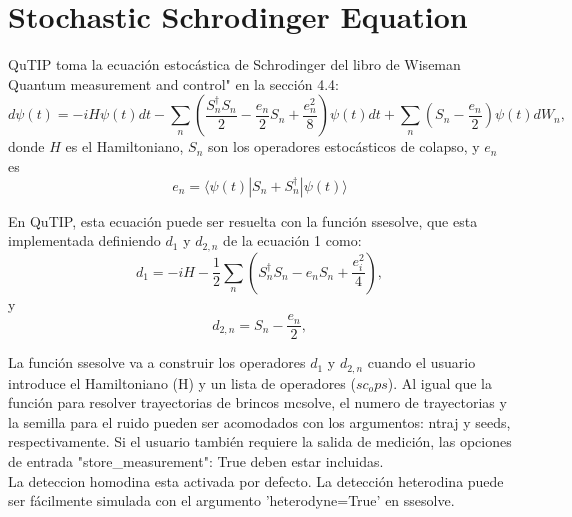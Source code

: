 \documentclass[12pt]{report}
\begin{document}
\section{Stochastic Schrodinger Equation}
QuTIP toma la ecuación estocástica de Schrodinger del libro de Wiseman Quantum measurement and control" en la sección 4.4:\\
\begin{equation}
    d\psi(t) = -iH\psi(t)dt - \sum_n (\dfrac{S_n^\dagger S_n}{2} - \dfrac{e_n}{2} S_n + \dfrac{e_n^2}{8}) \psi(t)dt + \sum_n (S_n - \dfrac{e_n}{2})\psi(t) dW_n ,
\end{equation}
donde $H$ es el Hamiltoniano, $S_n$ son los operadores estocásticos de colapso, y $e_n$ es 
\begin{equation}
    e_n = \langle \psi (t) | S_n + S_n^\dagger | \psi(t) \rangle  
\end{equation}

En QuTIP, esta ecuación puede ser resuelta con la función ssesolve, que esta implementada definiendo $d_1$ y $d_{2,n}$ de la ecuación 1 como:
\begin{equation}
    d_1 = -iH - \dfrac{1}{2} \sum_n ( S_n^\dagger S_n - e_n S_n + \dfrac{e_i^2}{4}),
\end{equation}
y
\begin{equation}
    d_{2,n} = S_n - \dfrac{e_n}{2},
\end{equation}

La función ssesolve va a construir los operadores $d_1$ y $d_{2,n}$ cuando el usuario introduce el Hamiltoniano (H) y un lista de operadores ($sc_ops$). Al igual que la función para resolver trayectorias de brincos mcsolve, el numero de trayectorias y la semilla para el ruido pueden ser acomodados con los argumentos: ntraj y seeds, respectivamente. Si el usuario también requiere la salida de medición, las opciones de entrada {"store_measurement": True} deben estar incluidas.\\

 La deteccion homodina esta activada por defecto. La detección heterodina puede ser fácilmente  simulada con el argumento 'heterodyne=True' en ssesolve.
\end{document}
